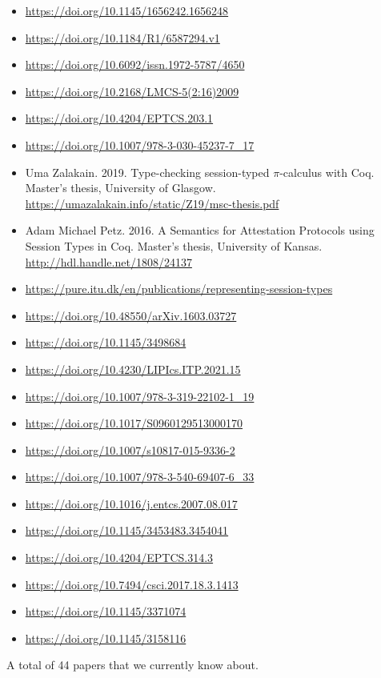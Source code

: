 \begin{itemize}
\item \url{https://doi.org/10.1145/1656242.1656248}
\item \url{https://doi.org/10.1184/R1/6587294.v1}
\item \url{https://doi.org/10.6092/issn.1972-5787/4650}
\item \url{https://doi.org/10.2168/LMCS-5(2:16)2009}
\item \url{https://doi.org/10.4204/EPTCS.203.1}
\item \url{https://doi.org/10.1007/978-3-030-45237-7_17}
\item Uma Zalakain. 2019. Type-checking session-typed $\pi$-calculus with Coq. Master's thesis, University of Glasgow. \url{https://umazalakain.info/static/Z19/msc-thesis.pdf}
\item Adam Michael Petz. 2016. A Semantics for Attestation Protocols using Session Types in Coq. Master's thesis, University of Kansas. \url{http://hdl.handle.net/1808/24137}
\item \url{https://pure.itu.dk/en/publications/representing-session-types}
\item \url{https://doi.org/10.48550/arXiv.1603.03727}
\item \url{https://doi.org/10.1145/3498684}
\item \url{https://doi.org/10.4230/LIPIcs.ITP.2021.15}
\item \url{https://doi.org/10.1007/978-3-319-22102-1_19}
\item \url{https://doi.org/10.1017/S0960129513000170}
\item \url{https://doi.org/10.1007/s10817-015-9336-2}
\item \url{https://doi.org/10.1007/978-3-540-69407-6_33}
\item \url{https://doi.org/10.1016/j.entcs.2007.08.017}
\item \url{https://doi.org/10.1145/3453483.3454041}
\item \url{https://doi.org/10.4204/EPTCS.314.3}
\item \url{https://doi.org/10.7494/csci.2017.18.3.1413}
\item \url{https://doi.org/10.1145/3371074}
\item \url{https://doi.org/10.1145/3158116}
\end{itemize}

A total of 44 papers that we currently know about.

